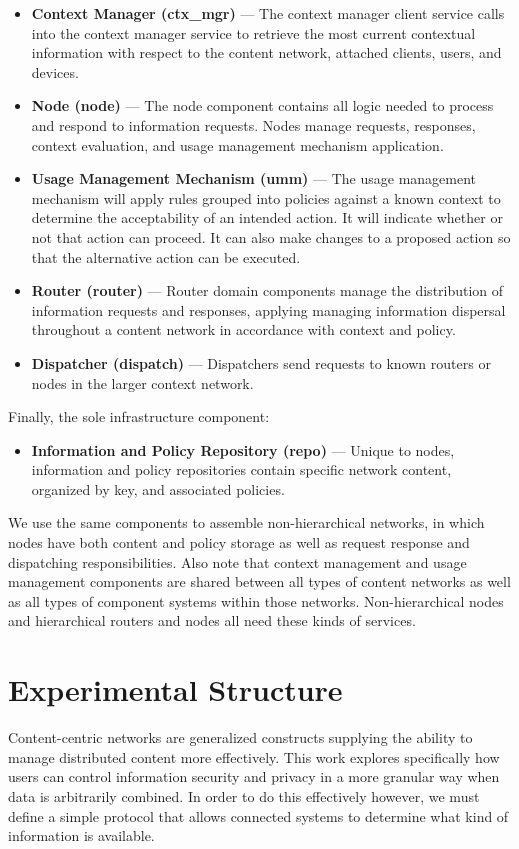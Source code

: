 \begin{itemize}
\item \textbf{Context Manager (ctx\_mgr)} --- The context manager client service calls into the context manager service to retrieve the most current contextual information with respect to the content network, attached clients, users, and devices.
\item \textbf{Node (node)} --- The node component contains all logic needed to process and respond to information requests.  Nodes manage requests, responses, context evaluation, and usage management mechanism application.
\item \textbf{Usage Management Mechanism (umm)} --- The usage management mechanism will apply rules grouped into policies against a known context to determine the acceptability of an intended action.  It will indicate whether or not that action can proceed.  It can also make changes to a proposed action so that the alternative action can be executed.
\item \textbf{Router (router)} --- Router domain components manage the distribution of information requests and responses, applying managing information dispersal throughout a content network in accordance with context and policy.
\item \textbf{Dispatcher (dispatch)} --- Dispatchers send requests to known routers or nodes in the larger context network.
\end{itemize}

Finally, the sole infrastructure component:

\begin{itemize}
\item \textbf{Information and Policy Repository (repo)} --- Unique to nodes, information and policy repositories contain specific network content, organized by key, and associated policies.
\end{itemize}

We use the same components to assemble non-hierarchical networks, in which nodes have both content and policy storage as well as request response and dispatching responsibilities.  Also note that context management and usage management components are shared between all types of content networks as well as all types of component systems within those networks.  Non-hierarchical nodes and hierarchical routers and nodes all need these kinds of services.

\section{Experimental Structure}
Content-centric networks are generalized constructs supplying the ability to manage distributed content more effectively.  This work explores specifically how users can control information security and privacy in a more granular way when data is arbitrarily combined.  In order to do this effectively however, we must define a simple protocol that allows connected systems to determine what kind of information is available.

